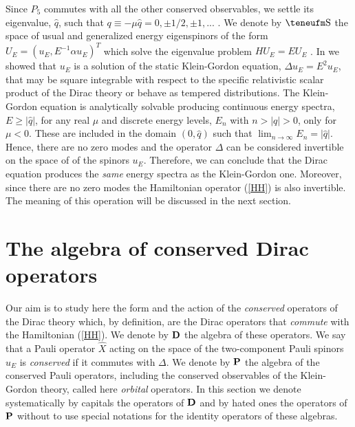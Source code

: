 \documentclass[a4paper,12pt]{article}
\begin{document}
 
Since $P_5$ commutes with all the other conserved observables, we settle
its eigenvalue, $\hat q$,  such that $q\equiv -\mu\hat q=0,\pm 1/2,\pm 1,
...$ \cite{GM,GRFH}. 
We denote  by $\Eh$ the space of usual and generalized energy eigenspinors 
of the form  $U_{E}=(u_{E}, E^{-1}\alpha u_{E})^{T}$ which solve the 
eigenvalue problem $HU_{E}=EU_{E}$ \cite{CV2}. In \cite{CV2,CV4} we showed 
that $u_{E}$ is a solution of the static Klein-Gordon equation, 
$\Delta u_{E}=E^{2} u_{E}$,  that may be square integrable with respect to 
the specific relativistic scalar product of the Dirac theory \cite{CV2} or 
behave as tempered distributions. The Klein-Gordon equation is analytically 
solvable producing continuous energy spectra,  $E\ge |\hat q|$, 
for any real $\mu$ and discrete energy levels, $E_{n}$ with $n>|q|>0$, 
only for $\mu<0$. These are included in the domain $(0,\hat q)$ such that 
$\lim_{n\to \infty}E_{n}=|\hat q|$. Hence,  there are no zero modes 
and the operator $\Delta$ can be considered invertible on the space of  
of the spinors $u_{E}$.    
Therefore, we can conclude that the Dirac equation produces the {\em same} 
energy spectra as the Klein-Gordon one. Moreover, since there are no zero 
modes the Hamiltonian operator (\ref{HH}) is also invertible. The meaning 
of this operation will be discussed in the next section.  


\section{The algebra of conserved Dirac operators}   

Our aim is to study here  the form and the action of the {\em conserved} 
operators of the Dirac theory which, by definition, are the Dirac operators 
that {\em commute} with the Hamiltonian (\ref{HH}). We denote by  ${\bf D}$ 
the algebra of these operators. We say that a Pauli operator $\hat X$ acting 
on the space of the two-component Pauli spinors $u_{E}$ is {\em conserved} 
if it commutes with $\Delta$. We denote by ${\bf P}$ the algebra of the 
conserved Pauli operators, including the conserved observables of the  
Klein-Gordon theory, called here {\em orbital} operators. In this section we 
denote systematically by capitals the operators of ${\bf D}$ and by hated ones 
the operators of ${\bf P}$ without to use special notations for the identity 
operators of these algebras.
\end{document}
